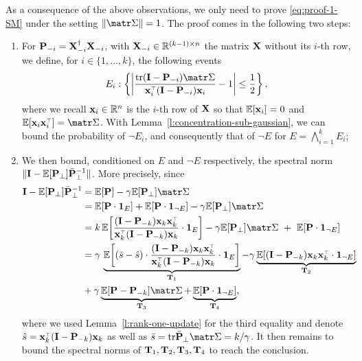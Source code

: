\documentclass[../../thesis.tex]{subfiles}
\begin{document}
\bigskip

As a consequence of the above observations, we only need to prove \eqref{eq:proof-1-SM} under the setting $\| \Sigmab \| = 1$. The proof comes in the following two steps:

\begin{enumerate}[leftmargin=*]
  \item For $\mathbf P_{-i} = \mathbf X_{-i}^\dagger \mathbf X_{-i}$, with $\mathbf X_{-i} \in \mathbb R^{(k-1) \times n}$ the matrix $\mathbf X$ without its $i$-th row, we define, for $i \in \{ 1, \ldots, k \}$, the following events
        \begin{equation}\label{eq:def-events-E-F}
          E_i: \left\{ \left| \frac{\tr (\I - \P_{-i}) \Sigmab}{\x_i^\top ( \I - \P_{-i}) \x_i} - 1 \right| \le \frac12 \right\},
        \end{equation}
        where we recall $\mathbf x_i \in \mathbb R^n$ is the $i$-th row of $\mathbf X$ so that $\mathbb E[\mathbf x_i] = 0$ and $\E[\x_i \x_i^\top] = \Sigmab$. With Lemma~\ref{l:concentration-sub-gaussian}, we can bound the probability of $\neg E_i$, and consequently that of $\neg E$ for $E = \bigwedge_{i=1}^k E_i$;
  \item We then bound, conditioned on $E$ and $\neg E$ respectively, the spectral norm $\| \mathbf I - \mathbb E[\mathbf P_\perp] \bar {\mathbf P}_\perp^{-1} \|$. More precisely, since
        \begin{align*}
          \I-\E[\P_\perp]\bar\P_\perp^{-1}
           & = \E[\P] - \gamma\E[\P_\perp]\Sigmab
          \\
           & = \E[\P \cdot \one_E] +
          \E[\P  \cdot \one_{\neg E}]
          -\gamma\E[\P_\perp]\Sigmab                                                                              \\
           & =k\,\E\bigg[\frac{(\I - \P_{-k})\x_k\x_k^\top}{\x_k^\top(\I - \P_{-k})\x_k} \cdot \one_E\bigg]
          -\gamma\E[\P_\perp]\Sigmab \ +\     \E[\P \cdot \one_{\neg E}]                                          \\
           & =\gamma\,\underbrace{\E\bigg[(\bar s-\hat
              s)\cdot\frac{(\I -\P_{-k})\x_k\x_k^\top}{\x_k^\top(\I -\P_{-k})\x_k} \cdot \one_E\bigg]}_{\T_1}
          - \gamma \underbrace{\E[ (\I - \P_{-k}) \x_k\x_k^\top \cdot \one_{\neg E}]}_{\T_2}                      \\
           & + \gamma \underbrace{\E[\P-\P_{-k}]\Sigmab}_{\T_3} + \underbrace{\E[\P \cdot \one_{\neg E}]}_{\T_4},
        \end{align*}
        where we used Lemma~\ref{l:rank-one-update} for the third equality and denote $\hat s = \x_k^\top ( \I - \P_{-k}) \x_k$ as well as $\bar s = \tr \bar \P_\perp \Sigmab =k/\gamma$. It then remains to bound the spectral norms of $ \mathbf{T}_1, \mathbf{T}_2, \mathbf{T}_3 ,\mathbf{T}_4$ to reach the conclusion.
\end{enumerate}
\end{document}
